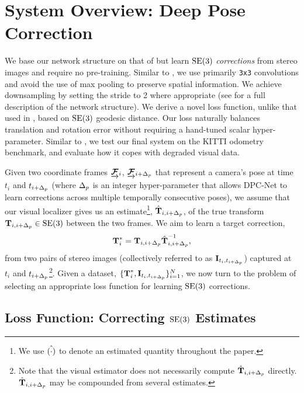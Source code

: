 \section{System Overview: Deep Pose Correction}

We base our network structure on that of \cite{Handa2016-hm} but learn $\mathrm{SE}(3)$ \textit{corrections} from stereo images and require no pre-training. Similar to \cite{Handa2016-hm}, we use primarily \texttt{3x3} convolutions and avoid the use of max pooling to preserve spatial information. We achieve downsampling by setting the stride to 2 where appropriate (see  for a full description of the network structure). We derive a novel loss function, unlike that used in \cite{Kendall2017-ix, Melekhov2017-dl, Oliveira2017-lt}, based on $\mathrm{SE}(3)$ geodesic distance. Our loss naturally balances translation and rotation error without requiring a hand-tuned scalar hyper-parameter. Similar to \cite{Costante2016-hb}, we test our final system on the KITTI odometry benchmark, and evaluate how it copes with degraded visual data. 

Given two coordinate frames $\underrightarrow{ \boldsymbol{\mathbf{\mathcal{F}}} }_{i}$, $\underrightarrow{ \boldsymbol{\mathbf{\mathcal{F}}} }_{i+\Delta_p}$ that represent a camera's pose at time $t_{i}$ and $t_{i+\Delta_p}$ (where $\Delta_p$ is an integer hyper-parameter that allows DPC-Net to learn corrections across multiple temporally consecutive poses), we assume that our visual localizer gives us an estimate\footnote{We use $\hat{(\cdot)}$ to denote an estimated quantity throughout the paper.}, $\hat{\boldsymbol{\mathbf{T}}}_{i,i+\Delta_p}$, of the true transform $\boldsymbol{\mathbf{T}}_{i,i+\Delta_p} \in \mathrm{SE}(3)$ between the two frames. We aim to learn a target correction,
\begin{equation}
	\boldsymbol{\mathbf{T}}^*_i = \boldsymbol{\mathbf{T}}_{i,i+\Delta_p} {\hat{\boldsymbol{\mathbf{T}}}_{i,i+\Delta_p}}^{-1},
\end{equation}
from two pairs of stereo images (collectively referred to as $\boldsymbol{\mathbf{I}}_{t_{i}, t_{i+\Delta_p}}$) captured at $t_{i}$ and $t_{i+\Delta_p}$\footnote{Note that the visual estimator does not necessarily compute $\hat{\boldsymbol{\mathbf{T}}}_{i,i+\Delta_p}$ directly. $\hat{\boldsymbol{\mathbf{T}}}_{i,i+\Delta_p}$ may be compounded from several estimates.}. Given a dataset, $\{ \boldsymbol{\mathbf{T}}^*_i, \boldsymbol{\mathbf{I}}_{t_{i}, t_{i+\Delta_p}} \}^N_{i=1}$,  we now turn to the problem of selecting an appropriate loss function for learning $\mathrm{SE}(3)$ corrections.

\subsection{Loss Function: Correcting $\mathrm{SE}(3)$ Estimates}

